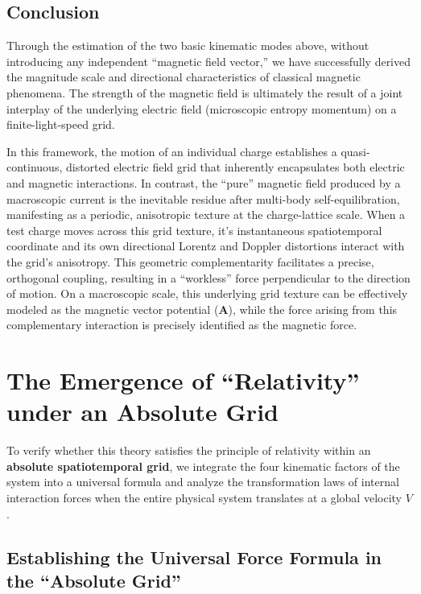 \documentclass[12pt, a4paper]{article}
\begin{document}
\subsection{Conclusion}

Through the estimation of the two basic kinematic modes above, without introducing any independent ``magnetic field vector,'' we have successfully derived the magnitude scale and directional characteristics of classical magnetic phenomena. The strength of the magnetic field is ultimately the result of a joint interplay of the underlying electric field (microscopic entropy momentum) on a finite-light-speed grid.

In this framework, the motion of an individual charge establishes a quasi-continuous, distorted electric field grid that inherently encapsulates both electric and magnetic interactions. In contrast, the ``pure'' magnetic field produced by a macroscopic current is the inevitable residue after multi-body self-equilibration, manifesting as a periodic, anisotropic texture at the charge-lattice scale. When a test charge moves across this grid texture, it's instantaneous spatiotemporal coordinate and its own directional Lorentz and Doppler distortions interact with the grid’s anisotropy. This geometric complementarity facilitates a precise, orthogonal coupling, resulting in a ``workless'' force perpendicular to the direction of motion. On a macroscopic scale, this underlying grid texture can be effectively modeled as the magnetic vector potential ($\mathbf{A}$), while the force arising from this complementary interaction is precisely identified as the magnetic force. 



\section{The Emergence of ``Relativity'' under an Absolute Grid}

To verify whether this theory satisfies the principle of relativity within an \textbf{absolute spatiotemporal grid}, we integrate the four kinematic factors of the system into a universal formula and analyze the transformation laws of internal interaction forces when the entire physical system translates at a global velocity $V$.

\subsection{Establishing the Universal Force Formula in the ``Absolute Grid''}
\end{document}
